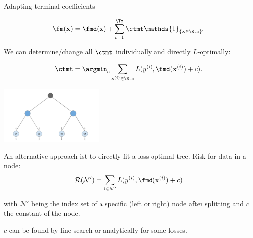 \documentclass[11pt,compress,t,notes=noshow, xcolor=table]{beamer}
\begin{document}
\begin{vbframe}{Adapting terminal coefficients}
\begin{small}
$$
\fm(\xv) = \fmd(\xv) +  \sum_{t=1}^{\Tm} \ctmt \mathds{1}_{\{\xv \in \Rtm\}}. 
$$

We can determine/change all $\ctmt$ individually and directly $L$-optimally:



$$ \ctmt = \argmin_{c} \sum_{\xi \in \Rtm} L(\yi, \fmd(\xi) + c). $$

\vspace{-0.5cm}

\begin{center}

\includegraphics[width=0.38\textwidth]{figure_man/gbm_leaf_adjustment.pdf}

\end{center}

\end{small}

\framebreak

An alternative approach ist to directly fit a loss-optimal tree.
Risk for data in a node:
$$
\mathcal{R}(\mathcal{N}') = \sum_{i \in \mathcal{N}'} L(\yi, \fmd(\xi) + c)
$$

with $\mathcal{N}'$ being the index set of a specific (left or right) node after splitting and $c$ the constant of the node.

\vfill

$c$ can be found by line search or analytically for some losses.
% 

\end{vbframe}
\end{document}
